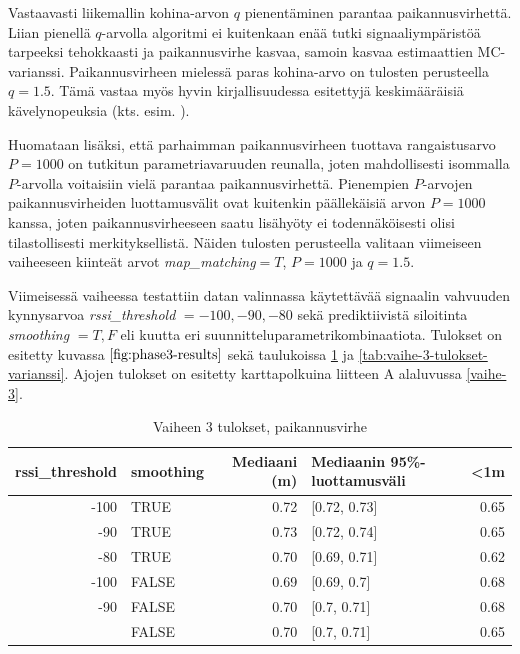 \documentclass[
  12pt,
  a4paper, twoside]{book}
\begin{document}
Vastaavasti liikemallin kohina-arvon \(q\) pienentäminen parantaa paikannusvirhettä. Liian pienellä \(q\)-arvolla algoritmi ei kuitenkaan enää tutki signaaliympäristöä tarpeeksi tehokkaasti ja paikannusvirhe kasvaa, samoin kasvaa estimaattien MC-varianssi. Paikannusvirheen mielessä paras kohina-arvo on tulosten perusteella \(q=1.5\). Tämä vastaa myös hyvin kirjallisuudessa esitettyjä keskimääräisiä kävelynopeuksia (kts. esim. \citep{Ho-2016}).

Huomataan lisäksi, että parhaimman paikannusvirheen tuottava rangaistusarvo \(P=1000\) on tutkitun parametriavaruuden reunalla, joten mahdollisesti isommalla \(P\)-arvolla voitaisiin vielä parantaa paikannusvirhettä. Pienempien \(P\)-arvojen paikannusvirheiden luottamusvälit ovat kuitenkin päällekäisiä arvon \(P=1000\) kanssa, joten paikannusvirheeseen saatu lisähyöty ei todennäköisesti olisi tilastollisesti merkityksellistä. Näiden tulosten perusteella valitaan viimeiseen vaiheeseen kiinteät arvot \emph{map\_matching}\(=T\), \(P=1000\) ja \(q=1.5\).

Viimeisessä vaiheessa testattiin datan valinnassa käytettävää signaalin vahvuuden kynnysarvoa \emph{rssi\_threshold} \(={-100,-90,-80}\) sekä prediktiivistä siloitinta \emph{smoothing} \(={T,F}\) eli kuutta eri suunnitteluparametrikombinaatiota. Tulokset on esitetty kuvassa \(\ref{fig:phase3-results}\) sekä taulukoissa \ref{tab:vaihe-3-tulokset} ja \ref{tab:vaihe-3-tulokset-varianssi}. Ajojen tulokset on esitetty karttapolkuina liitteen A alaluvussa \ref{vaihe-3}.

\begin{table}

\caption{\label{tab:vaihe-3-tulokset}Vaiheen 3 tulokset, paikannusvirhe}
\centering
\begin{tabular}[t]{rlrlr}
\toprule
rssi\_threshold & smoothing & Mediaani (m) & Mediaanin 95\%-luottamusväli & <1m\\
\midrule
-100 & TRUE & 0.72 & {}[0.72, 0.73] & 0.65\\
-90 & TRUE & 0.73 & {}[0.72, 0.74] & 0.65\\
-80 & TRUE & 0.70 & {}[0.69, 0.71] & 0.62\\
-100 & FALSE & 0.69 & {}[0.69, 0.7] & 0.68\\
-90 & FALSE & 0.70 & {}[0.7, 0.71] & 0.68\\
\addlinespace
-80 & FALSE & 0.70 & {}[0.7, 0.71] & 0.65\\
\bottomrule
\end{tabular}
\end{table}
\end{document}
